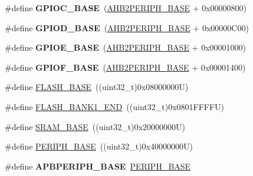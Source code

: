 \begin{DoxyCompactItemize}
\mbox{\label{group___peripheral__memory__map_ga26f267dc35338eef219544c51f1e6b3f}} 
\#define {\bfseries G\+P\+I\+O\+C\+\_\+\+B\+A\+SE}~(\hyperlink{group___peripheral__memory__map_gaeedaa71d22a1948492365e2cd26cfd46}{A\+H\+B2\+P\+E\+R\+I\+P\+H\+\_\+\+B\+A\+SE} + 0x00000800)
\item 
\mbox{\label{group___peripheral__memory__map_ga1a93ab27129f04064089616910c296ec}} 
\#define {\bfseries G\+P\+I\+O\+D\+\_\+\+B\+A\+SE}~(\hyperlink{group___peripheral__memory__map_gaeedaa71d22a1948492365e2cd26cfd46}{A\+H\+B2\+P\+E\+R\+I\+P\+H\+\_\+\+B\+A\+SE} + 0x00000\+C00)
\item 
\mbox{\label{group___peripheral__memory__map_gab487b1983d936c4fee3e9e88b95aad9d}} 
\#define {\bfseries G\+P\+I\+O\+E\+\_\+\+B\+A\+SE}~(\hyperlink{group___peripheral__memory__map_gaeedaa71d22a1948492365e2cd26cfd46}{A\+H\+B2\+P\+E\+R\+I\+P\+H\+\_\+\+B\+A\+SE} + 0x00001000)
\item 
\mbox{\label{group___peripheral__memory__map_ga7f9a3f4223a1a784af464a114978d26e}} 
\#define {\bfseries G\+P\+I\+O\+F\+\_\+\+B\+A\+SE}~(\hyperlink{group___peripheral__memory__map_gaeedaa71d22a1948492365e2cd26cfd46}{A\+H\+B2\+P\+E\+R\+I\+P\+H\+\_\+\+B\+A\+SE} + 0x00001400)
\item 
\#define \hyperlink{group___peripheral__memory__map_ga23a9099a5f8fc9c6e253c0eecb2be8db}{F\+L\+A\+S\+H\+\_\+\+B\+A\+SE}~((uint32\+\_\+t)0x08000000\+U)
\item 
\#define \hyperlink{group___peripheral__memory__map_ga443a2786535d83e32dfdc2b29e379332}{F\+L\+A\+S\+H\+\_\+\+B\+A\+N\+K1\+\_\+\+E\+ND}~((uint32\+\_\+t)0x0801\+F\+F\+F\+F\+U)
\item 
\#define \hyperlink{group___peripheral__memory__map_ga05e8f3d2e5868754a7cd88614955aecc}{S\+R\+A\+M\+\_\+\+B\+A\+SE}~((uint32\+\_\+t)0x20000000\+U)
\item 
\#define \hyperlink{group___peripheral__memory__map_ga9171f49478fa86d932f89e78e73b88b0}{P\+E\+R\+I\+P\+H\+\_\+\+B\+A\+SE}~((uint32\+\_\+t)0x40000000\+U)
\item 
\mbox{\label{group___peripheral__memory__map_gac85f31889eb6a3f651b563bbc7131f91}} 
\#define {\bfseries A\+P\+B\+P\+E\+R\+I\+P\+H\+\_\+\+B\+A\+SE}~\hyperlink{group___peripheral__memory__map_ga9171f49478fa86d932f89e78e73b88b0}{P\+E\+R\+I\+P\+H\+\_\+\+B\+A\+SE}

\end{DoxyCompactItemize}
